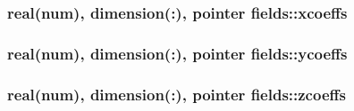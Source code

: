 \subsubsection[{\texorpdfstring{xcoeffs}{xcoeffs}}]{\setlength{\rightskip}{0pt plus 5cm}real(num), dimension(\+:), pointer fields\+::xcoeffs}\hypertarget{namespacefields_af385d7c4d2f11c483c899d7f4aa8b3ca}{}\label{namespacefields_af385d7c4d2f11c483c899d7f4aa8b3ca}
\subsubsection[{\texorpdfstring{ycoeffs}{ycoeffs}}]{\setlength{\rightskip}{0pt plus 5cm}real(num), dimension(\+:), pointer fields\+::ycoeffs}\hypertarget{namespacefields_a13ae96bfb25ee0698529585220416d5e}{}\label{namespacefields_a13ae96bfb25ee0698529585220416d5e}
\subsubsection[{\texorpdfstring{zcoeffs}{zcoeffs}}]{\setlength{\rightskip}{0pt plus 5cm}real(num), dimension(\+:), pointer fields\+::zcoeffs}\hypertarget{namespacefields_aab4aa30b16b003222aa946420ff709d6}{}\label{namespacefields_aab4aa30b16b003222aa946420ff709d6}

